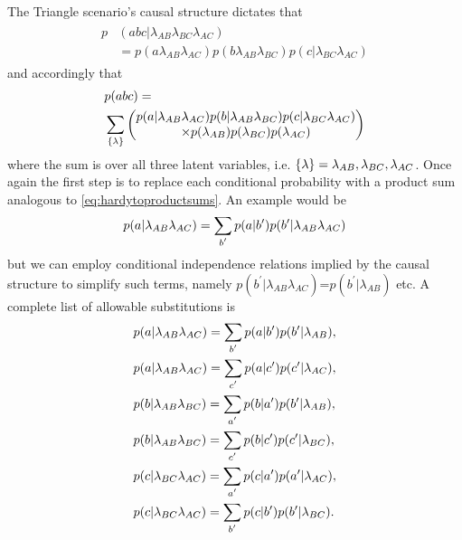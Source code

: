 The Triangle scenario's causal structure dictates that
\begin{align}\begin{split}\label{eq:tristructure}
p&(abc|\lambda_{AB}\lambda_{BC}\lambda_{AC})\\
&=p(a\lambda_{AB}\lambda_{AC})p(b\lambda_{AB}\lambda_{BC})p(c|\lambda_{BC}\lambda_{AC})
\end{split}\end{align}
and accordingly that
\begin{align}\begin{split}\label{eq:triintegration}
&p(abc)=\\
&\sum\limits_{\mathclap{\brackets{\lambda}}}
\begin{pmatrix}p(a|\lambda_{AB}\lambda_{AC})p(b|\lambda_{AB}\lambda_{BC})p(c|\lambda_{BC}\lambda_{AC})\\
\times p(\lambda_{AB})p(\lambda_{BC})p(\lambda_{AC})\end{pmatrix}
\end{split}\end{align}
where the sum is over all three latent variables, i.e. $\lbrace{\lambda\rbrace}={\lambda_{AB},\lambda_{BC},\lambda_{AC}}$.
Once again the first step is to replace each conditional probability with a product sum analogous to \cref{eq:hardytoproductsums}. An example would be 
\begin{align}
p(a|\lambda_{AB}\lambda_{AC})=\sum\limits_{\mathclap{b^{\prime}}}p(a|b^{\prime})p(b^{\prime}|\lambda_{AB}\lambda_{AC})
\end{align}
but we can employ conditional independence relations implied by the causal structure to simplify such terms, namely $p(b^{\prime}|\lambda_{AB}\lambda_{AC})$=$p(b^{\prime}|\lambda_{AB})$ etc. A complete list of allowable substitutions is
\begin{align}%
&p(a|\lambda_{AB}\lambda_{AC})=\sum\limits_{\mathclap{b^{\prime}}}p(a|b^{\prime})p(b^{\prime}|\lambda_{AB}),\label{eq:trisplitAtoB}\\
&p(a|\lambda_{AB}\lambda_{AC})=\sum\limits_{\mathclap{c^{\prime}}}p(a|c^{\prime})p(c^{\prime}|\lambda_{AC}),\label{eq:trisplitAtoC}\\
&p(b|\lambda_{AB}\lambda_{BC})=\sum\limits_{\mathclap{a^{\prime}}}p(b|a^{\prime})p(b^{\prime}|\lambda_{AB}),\label{eq:trisplitBtoA}\\
&p(b|\lambda_{AB}\lambda_{BC})=\sum\limits_{\mathclap{c^{\prime}}}p(b|c^{\prime})p(c^{\prime}|\lambda_{BC}),\label{eq:trisplitBtoC}\\
&p(c|\lambda_{BC}\lambda_{AC})=\sum\limits_{\mathclap{a^{\prime}}}p(c|a^{\prime})p(a^{\prime}|\lambda_{AC}),\label{eq:trisplitCtoA}\\
&p(c|\lambda_{BC}\lambda_{AC})=\sum\limits_{\mathclap{b^{\prime}}}p(c|b^{\prime})p(b^{\prime}|\lambda_{BC}).\label{eq:trisplitCtoB}
\end{align}
